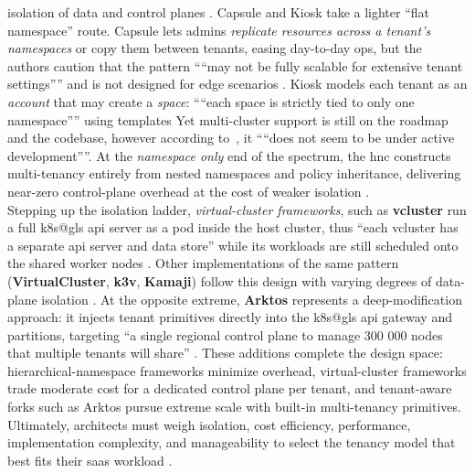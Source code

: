 \documentclass[11pt, a4paper, oneside, listof=totoc]{scrartcl}
\begin{document}
            isolation of data and control planes \parencite[p.~651]{nguyen2022}.
            Capsule and Kiosk take a lighter “flat namespace” route.  
            Capsule lets admins \textit{replicate resources across a tenant's namespaces} or copy
            them between tenants, easing day-to-day ops, but the authors caution that the pattern
            \enquote{“may not be fully scalable for extensive tenant settings”} and is not designed
            for edge scenarios \parencite[p.~144581]{senel2023}.
            Kiosk models each tenant as an \textit{account} that may create a \textit{space}:
            \enquote{“each space is strictly tied to only one namespace”} using templates
            \parencite[p.~144581]{senel2023}
            Yet multi-cluster support is still on the roadmap and the codebase, however according
            to~\cite{senel2023}, it \enquote{“does not seem to be under active development”}.
            At the \textit{namespace only} end of the spectrum, the \gls{hnc} constructs
            multi-tenancy entirely from nested namespaces and policy inheritance, delivering
            near-zero control-plane overhead at the cost of weaker isolation
            \parencite[p.~144581]{senel2023}.
            \\
            Stepping up the isolation ladder, \textit{virtual-cluster frameworks}, such as
            \textbf{vcluster} run a full \gls{k8s@gls} \gls{api} server as a pod inside the host
            cluster, thus \enquote{each vcluster has a separate \gls{api} server and data store}
            while its workloads are still scheduled onto the shared worker nodes
            \parencite[pp.~144580--144581]{senel2023}.
            Other implementations of the same pattern (\textbf{VirtualCluster}, \textbf{k3v},
            \textbf{Kamaji}) follow this design with varying degrees of data-plane isolation
            \parencite[pp.~144580--144581]{senel2023}.
            At the opposite extreme, \textbf{Arktos} represents a deep-modification approach: it
            injects tenant primitives directly into the \gls{k8s@gls} \gls{api} gateway and
            partitions, targeting \enquote{a single regional control plane to manage 300 000 nodes
            that multiple tenants will share} \parencite[p.~144582]{senel2023}.
            These additions complete the design space: hierarchical-namespace frameworks minimize
            overhead, virtual-cluster frameworks trade moderate cost for a dedicated control plane
            per tenant, and tenant-aware forks such as Arktos pursue extreme scale with built-in
            multi-tenancy primitives.
            \\
            Ultimately, architects must weigh isolation, cost efficiency, performance,
            implementation complexity, and manageability to select the tenancy model that best fits
            their \gls{saas} workload \parencite[p.~137]{azureWhitepaper}.
\end{document}
